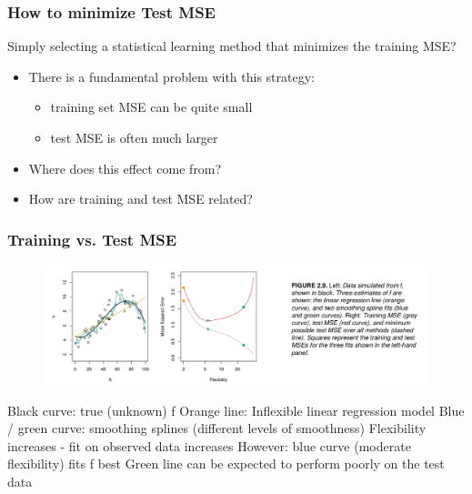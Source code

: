 \documentclass{beamer}
\begin{document}
\begin{frame}
\frametitle{How to minimize Test MSE}
Simply selecting a statistical learning method that
minimizes the training MSE?
\begin{itemize}
\item There is a fundamental problem with this strategy:
\begin{itemize}
\item training set MSE can be quite small
\item test MSE is often much larger
\end{itemize} 
\item Where does this effect come from?
\item How are training and test MSE related?
\end{itemize}
\end{frame}


\begin{frame}
\frametitle{Training vs. Test MSE}

\begin{figure}
\includegraphics[width = 1\linewidth]{figures/03/figure_2_6.png}
\end{figure}

Black curve: true (unknown) f
\newline
Orange line: Inflexible linear regression model
\newline
Blue / green curve: smoothing splines (different levels of smoothness)
\newline
Flexibility increases - fit on observed data increases
\newline
However: blue curve (moderate flexibility) fits f best
\newline
Green line can be expected to perform poorly on the test data

\end{frame}
\end{document}
